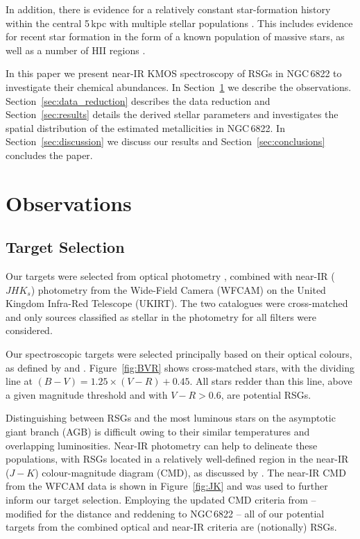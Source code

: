 In addition, there is evidence for a relatively constant star-formation history within the central 5\,kpc
\citep{2014ApJ...789..147W}
with multiple stellar populations
\citep{2006A&A...451...99B,2012A&A...540A.135S}.
This includes evidence for recent star formation in the form of a known population of massive stars, as well as a number of HII regions
\citep{2001ApJ...547..765V,2006AJ....131..343D,2009A&A...505.1027H,2012AJ....144....2L}.

In this paper we present near-IR KMOS spectroscopy of RSGs in NGC\,6822 to investigate their chemical abundances.
In Section~\ref{sec:observations} we describe the observations.
Section~\ref{sec:data_reduction} describes the data reduction and
Section~\ref{sec:results} details the derived stellar parameters and investigates the spatial distribution of the estimated metallicities in NGC\,6822.
In Section~\ref{sec:discussion} we discuss our results and
Section~\ref{sec:conclusions} concludes the paper.


\section{Observations}
\label{sec:observations}

\subsection{Target Selection} %
\label{sub:target_selection}

Our targets were selected from optical photometry
\citep{2007AJ....134.2474M}, combined with near-IR ($JHK{_s}$) photometry
\cite[for details see][]{2012A&A...540A.135S} from the Wide-Field Camera (WFCAM) on the United Kingdom Infra-Red Telescope (UKIRT).
The two catalogues were cross-matched and only sources classified as stellar in the photometry for all filters were considered.

Our spectroscopic targets were selected principally based on their optical colours, as defined by
\cite{1998ApJ...501..153M} and
\cite{2012AJ....144....2L}.
Figure~\ref{fig:BVR} shows cross-matched stars, with the dividing line at $(B - V) = 1.25 \times (V - R)+0.45$.
All stars redder than this line, above a given magnitude threshold and with $V - R > 0.6$, are potential RSGs.

Distinguishing between RSGs and the most luminous stars on the asymptotic giant branch
(AGB) is difficult owing to their similar temperatures and overlapping luminosities.
Near-IR photometry can help to delineate these populations,
with RSGs located in a relatively well-defined region in the near-IR ($J-K$) colour-magnitude diagram (CMD), as discussed by
\cite{2000ApJ...542..804N}.
The near-IR CMD from the WFCAM data is shown in
Figure~\ref{fig:JK} and was used to further inform our target selection.
Employing the updated CMD criteria from
\cite{2014A&A...562A..32C}  -- modified for the distance and reddening to NGC\,6822 --
all of our potential targets from the combined optical and near-IR criteria are (notionally) RSGs.


